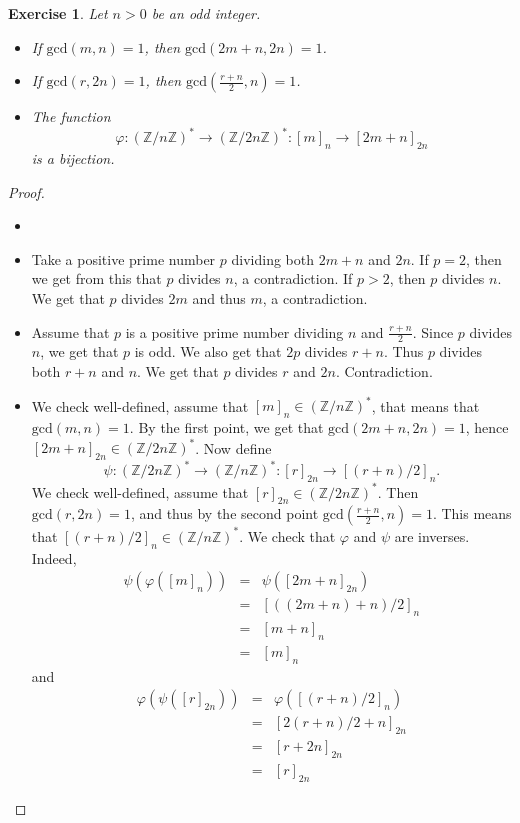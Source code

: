\documentclass[a4paper, 11pt]{book}
\theoremstyle{plain}
\newtheorem{exercise}[theorem]{Exercise}
\theoremstyle{plain}
\begin{document}
\begin{exercise}
Let $n>0$ be an odd integer.
\begin{itemize}
    \item If $\text{gcd}(m,n)=1$, then $\text{gcd}(2m+n, 2n)=1$.
    \item If $\text{gcd}(r,2n)=1$, then $\text{gcd}\left(\frac{r+n}{2},n\right)=1$.
    \item The function
    $$\varphi: (\mathbb{Z}/n\mathbb{Z})^*\rightarrow (\mathbb{Z}/2n\mathbb{Z})^*:[m]_n\rightarrow [2m+n]_{2n}$$
    is a bijection.
\end{itemize}
\end{exercise}
\begin{proof}
\begin{itemize}
    \item[]
    \item Take a positive prime number $p$ dividing both $2m+n$ and $2n$. If $p=2$, then we get from this that $p$ divides $n$, a contradiction. If $p>2$, then $p$ divides $n$. We get that $p$ divides $2m$ and thus $m$, a contradiction.
    \item Assume that $p$ is a positive prime number dividing $n$ and $\frac{r+n}{2}$. Since $p$ divides $n$, we get that $p$ is odd. We also get that $2p$ divides $r+n$. Thus $p$ divides both $r+n$ and $n$. We get that $p$ divides $r$ and $2n$. Contradiction.
    \item We check well-defined, assume that $[m]_n\in (\mathbb{Z}/n\mathbb{Z})^*$, that means that $\text{gcd}(m,n)=1$. By the first point, we get that $\text{gcd}(2m+n, 2n)=1$, hence $[2m+n]_{2n}\in (\mathbb{Z}/2n\mathbb{Z})^*$. Now define
    $$\psi:(\mathbb{Z}/2n\mathbb{Z})^*\rightarrow (\mathbb{Z}/n\mathbb{Z})^*:[r]_{2n}\rightarrow [(r+n)/2]_n.$$
    We check well-defined, assume that $[r]_{2n}\in (\mathbb{Z}/2n\mathbb{Z})^*$. Then $\text{gcd}(r,2n)=1$, and thus by the second point $\text{gcd}\left(\frac{r+n}{2},n\right)=1$. This means that $[(r+n)/2]_n\in (\mathbb{Z}/n\mathbb{Z})^*$. We check that $\varphi$ and $\psi$ are inverses. Indeed,
    \begin{eqnarray*}
    \psi(\varphi([m]_n))
    & = & \psi([2m+n]_{2n})\\
    & = & [((2m+n) + n)/2]_n\\
    & = & [m+n]_n\\
    & = & [m]_n
    \end{eqnarray*}
    and
    \begin{eqnarray*}
    \varphi(\psi([r]_{2n}))
    & = & \varphi( [(r+n)/2]_n)\\
    & = & [2(r+n)/2 + n]_{2n}\\
    & = & [r+2n]_{2n}\\
    & = & [r]_{2n}
    \end{eqnarray*}
\end{itemize}
\end{proof}
\end{document}
